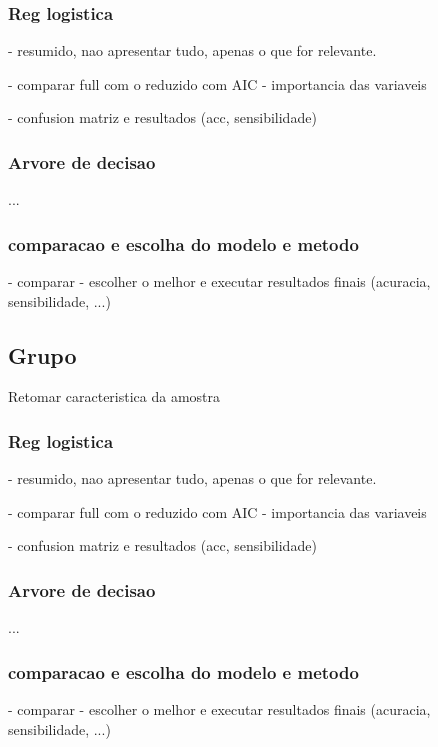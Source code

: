 \documentclass[
	article,			%
	11pt,				%
	oneside,			%
	a4paper,			%
	english,			%
	brazil,				%
	sumario=tradicional
	]{abntex2}
\begin{document}
\subsubsection{Reg logistica}

- resumido, nao apresentar tudo, apenas o que for relevante.

- comparar full com o reduzido com AIC
- importancia das variaveis

- confusion matriz e resultados (acc, sensibilidade)
\subsubsection{Arvore de decisao}
... 

\subsubsection{comparacao e escolha do modelo e metodo}

- comparar
- escolher o melhor e executar resultados finais (acuracia, sensibilidade, ...)

\subsection{Grupo}
Retomar caracteristica da amostra
\subsubsection{Reg logistica}

- resumido, nao apresentar tudo, apenas o que for relevante.

- comparar full com o reduzido com AIC
- importancia das variaveis

- confusion matriz e resultados (acc, sensibilidade)
\subsubsection{Arvore de decisao}
... 

\subsubsection{comparacao e escolha do modelo e metodo}

- comparar
- escolher o melhor e executar resultados finais (acuracia, sensibilidade, ...)


\lipsum[7]

% 
\end{document}
